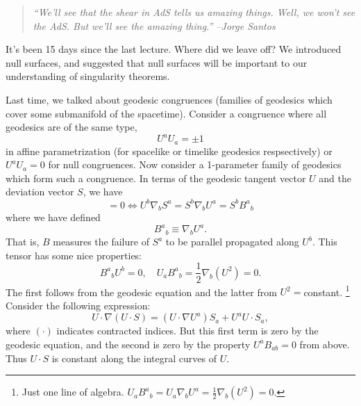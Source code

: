 \begin{quote}
    \textit{``We'll see that the shear in AdS tells us amazing things. Well, we won't see the AdS. But we'll see the amazing thing.'' --Jorge Santos}
\end{quote}
It's been 15 days since the last lecture. Where did we leave off? We introduced null surfaces, and suggested that null surfaces will be important to our understanding of singularity theorems.

Last time, we talked about geodesic congruences (families of geodesics which cover some submanifold of the spacetime). Consider a congruence where all geodesics are of the same type,
\begin{equation*}
    U^a U_a = \pm 1
\end{equation*}
in affine parametrization (for spacelike or timelike geodesics respsectively) or $U^a U_a =0$ for null congruences.
Now consider a 1-parameter family of geodesics which form such a congruence. In terms of the geodesic tangent vector $U$ and the deviation vector $S$, we have
\begin{equation}
    [S,U]=0\iff U^b \nabla_b S^a = S^b \nabla_b U^a = S^b B^a{}_b
\end{equation}
where we have defined
\begin{equation}
    B^a{}_b \equiv \nabla_b U^a.
\end{equation}
That is, $B$ measures the failure of $S^a$ to be parallel propagated along $U^b$. This tensor has some nice properties:
\begin{equation}
    B^a{}_b U^b =0, \quad U_a B^a{}_b = \frac{1}{2} \nabla_b(U^2)=0.
\end{equation}
The first follows from the geodesic equation and the latter from $U^2=$constant.%
    \footnote{Just one line of algebra. $U_a B^a{}_b=U_a \nabla_b U^a = \frac{1}{2} \nabla_b(U^2)=0$.}
Consider the following expression:
\begin{equation}
     U\cdot \nabla(U\cdot S) = (U\cdot \nabla U^a) S_a + U^a U\cdot S_a,
\end{equation}
where $(\cdot)$ indicates contracted indices. But this first term is zero by the geodesic equation, and the second is zero by the property $U^a B_{ab}=0$ from above. Thus $U\cdot S$ is constant along the integral curves of $U$.

